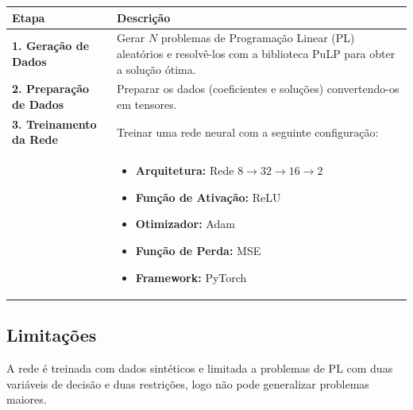 \documentclass[12pt, a4paper]{article}
\begin{document}
\begin{tabular}{|p{}|p{}|}
\hline
\textbf{Etapa} & \textbf{Descrição} \\
\hline
\textbf{1. Geração de Dados} & Gerar $N$ problemas de Programação Linear (PL) aleatórios e resolvê-los com a biblioteca PuLP para obter a solução ótima. \\
\hline
\textbf{2. Preparação de Dados} & Preparar os dados (coeficientes e soluções) convertendo-os em tensores. \\
\hline
\textbf{3. Treinamento da Rede} & Treinar uma rede neural com a seguinte configuração: \\
& \begin{itemize}
    \item \textbf{Arquitetura:} Rede $8 \to 32 \to 16 \to 2$
    \item \textbf{Função de Ativação:} ReLU
    \item \textbf{Otimizador:} Adam
    \item \textbf{Função de Perda:} MSE
    \item \textbf{Framework:} PyTorch
\end{itemize} \\
\hline
\end{tabular}

\subsection{Limitações}
A rede é treinada com dados sintéticos e limitada a problemas de PL com duas variáveis de decisão e duas restrições, logo não pode generalizar problemas maiores.
\end{document}
